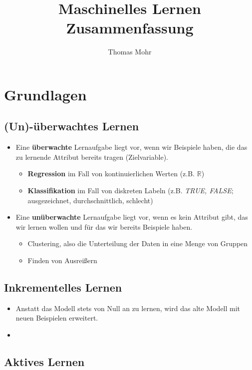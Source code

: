 \documentclass{scrartcl}
\title{Maschinelles Lernen \\ Zusammenfassung}
\author{Thomas Mohr}
\date{}
\begin{document}
\maketitle
\pagebreak
\tableofcontents
\pagebreak

\section{Grundlagen}

\subsection{(Un)-überwachtes Lernen}

\begin{itemize}
	\item Eine \textbf{überwachte} Lernaufgabe liegt vor, wenn wir Beispiele 
	haben, die das zu lernende Attribut bereits tragen (Zielvariable).
	\begin{itemize}
		\item \textbf{Regression} im Fall von kontinuierlichen Werten (z.B. $ 
		\mathbb{R} $)
		\item \textbf{Klassifikation} im Fall von diskreten Labeln (z.B. 
		\textit{TRUE, FALSE}; ausgezeichnet, durchschnittlich, schlecht)
	\end{itemize}
	\item Eine \textbf{unüberwachte} Lernaufgabe liegt vor, wenn es kein 
	Attribut gibt, das wir lernen wollen und für das wir bereits Beispiele 
	haben.
	\begin{itemize}
		\item Clustering, also die Unterteilung der Daten in eine Menge 
		von Gruppen
		\item Finden von Ausreißern
	\end{itemize}
\end{itemize}

\subsection{Inkrementelles Lernen}

\begin{itemize}
	\item Anstatt das Modell stets von Null an zu lernen, wird das alte Modell 
	mit neuen Beispielen erweitert.
	\item 
\end{itemize}

\subsection{Aktives Lernen}
\end{document}
